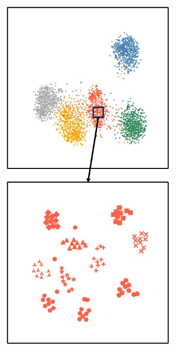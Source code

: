 \begin{figure}[h!]
    \centering
    \begin{subfigure}{0.24\columnwidth}
    \includegraphics[width=\columnwidth]{figures/MGSRCL/t-SNE/Base.pdf}

\end{subfigure}
\end{figure}
